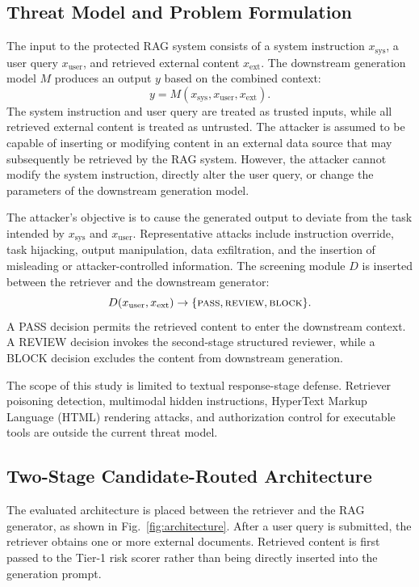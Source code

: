 \documentclass[conference,a4paper]{IEEEtran}
\begin{document}
\subsection{Threat Model and Problem Formulation}
The input to the protected RAG system consists of a system instruction $x_{\mathrm{sys}}$, a user query $x_{\mathrm{user}}$, and retrieved external content $x_{\mathrm{ext}}$. The downstream generation model $M$ produces an output $y$ based on the combined context:
\begin{equation}
y=M(x_{\mathrm{sys}},x_{\mathrm{user}},x_{\mathrm{ext}}).
\end{equation}
The system instruction and user query are treated as trusted inputs, while all retrieved external content is treated as untrusted. The attacker is assumed to be capable of inserting or modifying content in an external data source that may subsequently be retrieved by the RAG system. However, the attacker cannot modify the system instruction, directly alter the user query, or change the parameters of the downstream generation model.

The attacker's objective is to cause the generated output to deviate from the task intended by $x_{\mathrm{sys}}$ and $x_{\mathrm{user}}$. Representative attacks include instruction override, task hijacking, output manipulation, data exfiltration, and the insertion of misleading or attacker-controlled information. The screening module $D$ is inserted between the retriever and the downstream generator:
\begin{equation}
D(x_{\mathrm{user}},x_{\mathrm{ext}})\rightarrow
\{\textsc{pass},\textsc{review},\textsc{block}\}.
\end{equation}
A PASS decision permits the retrieved content to enter the downstream context. A REVIEW decision invokes the second-stage structured reviewer, while a BLOCK decision excludes the content from downstream generation.

The scope of this study is limited to textual response-stage defense. Retriever poisoning detection, multimodal hidden instructions, HyperText Markup Language (HTML) rendering attacks, and authorization control for executable tools are outside the current threat model.

\subsection{Two-Stage Candidate-Routed Architecture}
The evaluated architecture is placed between the retriever and the RAG generator, as shown in Fig.~\ref{fig:architecture}. After a user query is submitted, the retriever obtains one or more external documents. Retrieved content is first passed to the Tier-1 risk scorer rather than being directly inserted into the generation prompt.
\end{document}
